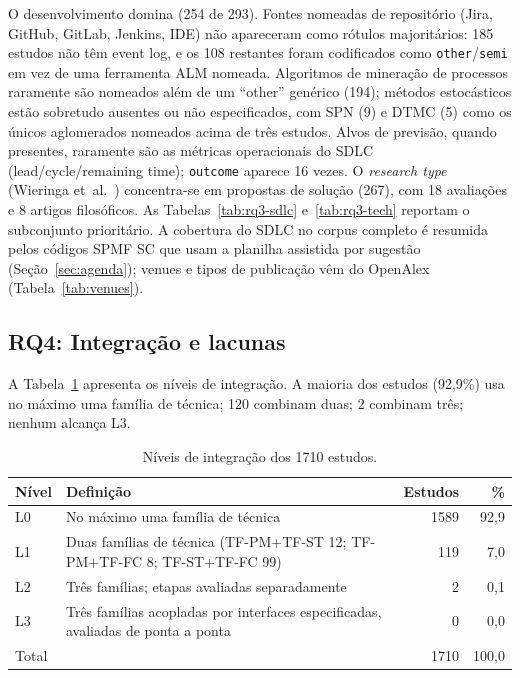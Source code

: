 \documentclass[preprint,12pt,authoryear=false]{elsarticle}
\newcommand{\PM}{TF-PM}
\newcommand{\ST}{TF-ST}
\newcommand{\FC}{TF-FC}
\begin{document}
O desenvolvimento domina (254 de 293). Fontes nomeadas de repositório (Jira, GitHub, GitLab, Jenkins, IDE) não apareceram como rótulos majoritários: 185 estudos não têm event log, e os 108 restantes foram codificados como \texttt{other}/\texttt{semi} em vez de uma ferramenta ALM nomeada. Algoritmos de mineração de processos raramente são nomeados além de um ``other'' genérico (194); métodos estocásticos estão sobretudo ausentes ou não especificados, com SPN (9) e DTMC (5) como os únicos aglomerados nomeados acima de três estudos. Alvos de previsão, quando presentes, raramente são as métricas operacionais do SDLC (lead/cycle/remaining time); \texttt{outcome} aparece 16 vezes. O \emph{research type} (Wieringa et~al.~\cite{wieringa2006}) concentra-se em propostas de solução (267), com 18 avaliações e 8 artigos filosóficos. As Tabelas~\ref{tab:rq3-sdlc} e~\ref{tab:rq3-tech} reportam o subconjunto prioritário. A cobertura do SDLC no corpus completo é resumida pelos códigos SPMF SC que usam a planilha assistida por sugestão (Seção~\ref{sec:agenda}); venues e tipos de publicação vêm do OpenAlex (Tabela~\ref{tab:venues}).

\subsection{RQ4: Integração e lacunas}\label{sec:rq4}

A Tabela~\ref{tab:levels} apresenta os níveis de integração. A maioria dos estudos (92,9\%) usa no máximo uma família de técnica; 120 combinam duas; 2 combinam três; nenhum alcança L3.

\begin{table}[t]
\centering\small
\caption{Níveis de integração dos 1710 estudos.}\label{tab:levels}
\begin{tabularx}{\textwidth}{lXrr}
\toprule
Nível & Definição & Estudos & \% \\
\midrule
L0 & No máximo uma família de técnica & 1589 & 92,9 \\
L1 & Duas famílias de técnica (\PM{}+\ST{} 12; \PM{}+\FC{} 8; \ST{}+\FC{} 99) & 119 & 7,0 \\
L2 & Três famílias; etapas avaliadas separadamente & 2 & 0,1 \\
L3 & Três famílias acopladas por interfaces especificadas, avaliadas de ponta a ponta & 0 & 0,0 \\
\midrule
Total & & 1710 & 100,0 \\
\bottomrule
\end{tabularx}
\end{table}
\end{document}
